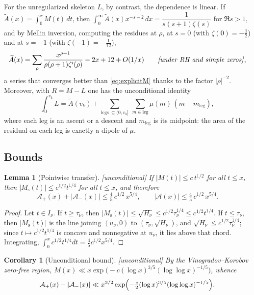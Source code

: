 \documentclass[11pt,reqno]{amsart}
\theoremstyle{plain}
\newtheorem{lemma}[theorem]{Lemma}
\newtheorem{corollary}[theorem]{Corollary}
\theoremstyle{definition}
\newcommand{\Ms}{M_{\mathrm{s}}}
\newcommand{\Ap}{\mathcal{A}_{+}}
\newcommand{\Am}{\mathcal{A}_{-}}
\newcommand{\Anet}{\mathcal{A}}
\begin{document}
For the unregularized skeleton $L$, by contrast, the dependence is linear.
If $\widetilde{A}(x)=\int_0^x M(t)\,dt$, then
$\int_0^\infty \widetilde{A}(x)x^{-s-2}\,dx=\dfrac{1}{s(s+1)\zeta(s)}$ for
$\Re s>1$, and by Mellin inversion, computing the residues at $\rho$, at
$s=0$ (with $\zeta(0)=-\tfrac12$) and at $s=-1$ (with
$\zeta(-1)=-\tfrac1{12}$),
\begin{equation}
\label{eq:explicitA}
  \widetilde{A}(x)=\sum_{\rho}\frac{x^{\rho+1}}{\rho(\rho+1)\zeta'(\rho)}
  -2x+12+O(1/x)
  \qquad\text{\emph{[under RH and simple zeros]}},
\end{equation}
a series that converges better than \eqref{eq:explicitM} thanks to the
factor $|\rho|^{-2}$. Moreover, with $R=M-L$ one has the unconditional
identity
\begin{equation}
\label{eq:dipoles}
  \int_0^{v_k}L
  =\widetilde{A}(v_k)+\sum_{\text{legs}\ \subseteq (0,v_k]}\ \sum_{m\in\text{leg}}\mu(m)\,(m-m_{\text{leg}}),
\end{equation}
where each leg is an ascent or a descent and $m_{\text{leg}}$ is its
midpoint: the area of the residual on each leg is exactly a dipole of $\mu$.

\subsection{Bounds}
\label{subsec:bounds}

\begin{lemma}[Pointwise transfer]
\label{lem:transfer}
\emph{[unconditional]} If $|M(t)|\le c\,t^{1/2}$ for all $t\le x$, then
$|\Ms(t)|\le c^{1/2}t^{1/4}$ for all $t\le x$, and therefore
\[
  \Ap(x)+|\Am(x)|\le \tfrac45\,c^{1/2}\,x^{5/4},
  \qquad |\Anet(x)|\le \tfrac45\,c^{1/2}\,x^{5/4}.
\]
\end{lemma}

\begin{proof}
Let $t\in I_\nu$. If $t\ge\tau_\nu$, then
$|\Ms(t)|\le\sqrt{H_\nu}\le c^{1/2}\tau_\nu^{1/4}\le c^{1/2}t^{1/4}$. If
$t\le\tau_\nu$, then $|\Ms(t)|$ is the line joining $(u_\nu,0)$ to
$(\tau_\nu,\sqrt{H_\nu})$, and $\sqrt{H_\nu}\le c^{1/2}\tau_\nu^{1/4}$;
since $t\mapsto c^{1/2}t^{1/4}$ is concave and nonnegative at $u_\nu$, it
lies above that chord. Integrating,
$\int_0^x c^{1/2}t^{1/4}dt=\tfrac45 c^{1/2}x^{5/4}$.
\end{proof}

\begin{corollary}[Unconditional bound]
\label{cor:uncond}
\emph{[unconditional]} By the Vinogradov--Korobov zero-free region,
$M(x)\ll x\exp\bigl(-c(\log x)^{3/5}(\log\log x)^{-1/5}\bigr)$, whence
\[
  \Ap(x)+|\Am(x)|\ll x^{3/2}\exp\Bigl(-\tfrac{c}{2}(\log x)^{3/5}(\log\log x)^{-1/5}\Bigr).
\]
\end{corollary}
\end{document}
